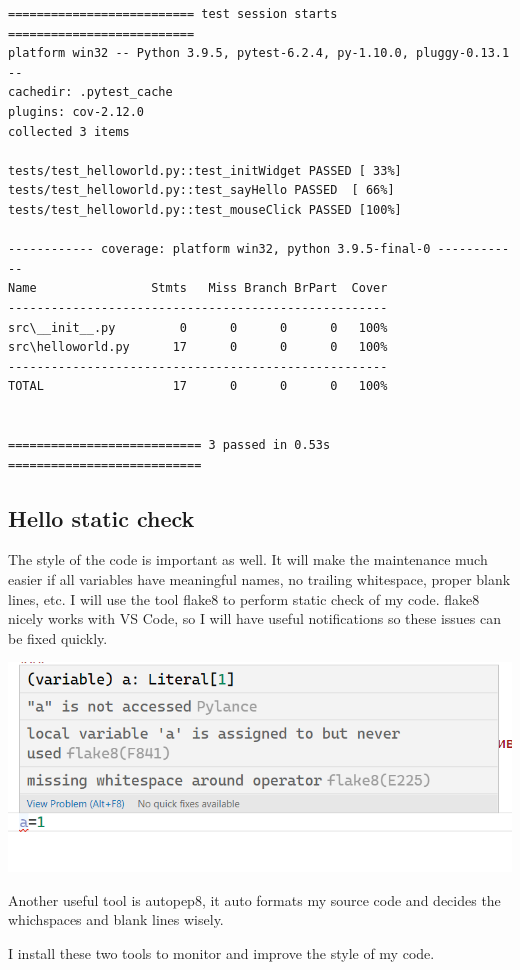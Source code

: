 \documentclass[a4paper]{report}
\begin{document}
\begin{verbatim}
========================== test session starts ==========================
platform win32 -- Python 3.9.5, pytest-6.2.4, py-1.10.0, pluggy-0.13.1 --
cachedir: .pytest_cache
plugins: cov-2.12.0
collected 3 items

tests/test_helloworld.py::test_initWidget PASSED [ 33%]
tests/test_helloworld.py::test_sayHello PASSED  [ 66%]
tests/test_helloworld.py::test_mouseClick PASSED [100%]

------------ coverage: platform win32, python 3.9.5-final-0 ------------
Name                Stmts   Miss Branch BrPart  Cover
-----------------------------------------------------
src\__init__.py         0      0      0      0   100%
src\helloworld.py      17      0      0      0   100%
-----------------------------------------------------
TOTAL                  17      0      0      0   100%


=========================== 3 passed in 0.53s ===========================
\end{verbatim}

\subsection{Hello static check}

The style of the code is important as well. It will make the maintenance much easier if all variables have meaningful names, no trailing whitespace, proper blank lines, etc. I will use the tool flake8 to perform static check of my code. flake8 nicely works with VS Code, so I will have useful notifications so these issues can be fixed quickly.

\includegraphics[width=\linewidth]{flake8.png}

Another useful tool is autopep8, it auto formats my source code and decides the whichspaces and blank lines wisely. 

I install these two tools to monitor and improve the style of my code.
\end{document}
